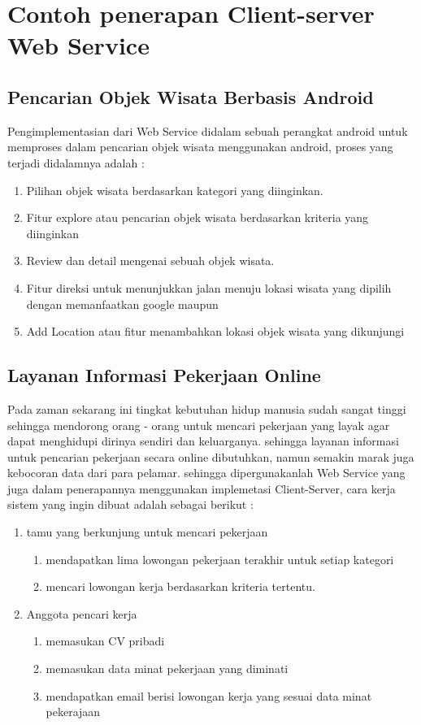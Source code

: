 \section{Contoh penerapan Client-server Web Service}

\subsection{Pencarian Objek Wisata Berbasis Android}
Pengimplementasian dari Web Service didalam sebuah perangkat android untuk memproses
dalam pencarian objek wisata menggunakan android, proses yang terjadi didalamnya adalah :

\begin{enumerate}
    \item Pilihan objek wisata berdasarkan kategori yang diinginkan.
    \item Fitur explore atau pencarian objek wisata berdasarkan kriteria yang diinginkan
    \item Review dan detail mengenai sebuah objek wisata.
    \item Fitur direksi untuk menunjukkan jalan menuju lokasi wisata yang dipilih dengan memanfaatkan google maupun
    \item Add Location atau fitur menambahkan lokasi objek wisata yang dikunjungi
\end{enumerate}

\subsection{Layanan Informasi Pekerjaan Online}
Pada zaman sekarang ini tingkat kebutuhan hidup manusia sudah sangat tinggi sehingga mendorong orang - orang
untuk mencari pekerjaan yang layak agar dapat menghidupi dirinya sendiri dan keluarganya. sehingga 
layanan informasi untuk pencarian pekerjaan secara online dibutuhkan, namun semakin marak juga kebocoran
data dari para pelamar. sehingga dipergunakanlah Web Service yang juga dalam penerapannya menggunakan
implemetasi Client-Server, cara kerja sistem yang ingin dibuat adalah sebagai berikut :

\begin{enumerate}
    \item tamu yang berkunjung untuk mencari pekerjaan 
    \begin{enumerate}
        \item mendapatkan lima lowongan pekerjaan terakhir untuk setiap kategori
        \item mencari lowongan kerja berdasarkan kriteria tertentu.
    \end{enumerate}

    \item Anggota pencari kerja

    \begin{enumerate}
        \item memasukan CV pribadi
        \item memasukan data minat pekerjaan yang diminati
        \item mendapatkan email berisi lowongan kerja yang sesuai data minat pekerajaan
    \end{enumerate}
\end{enumerate}

